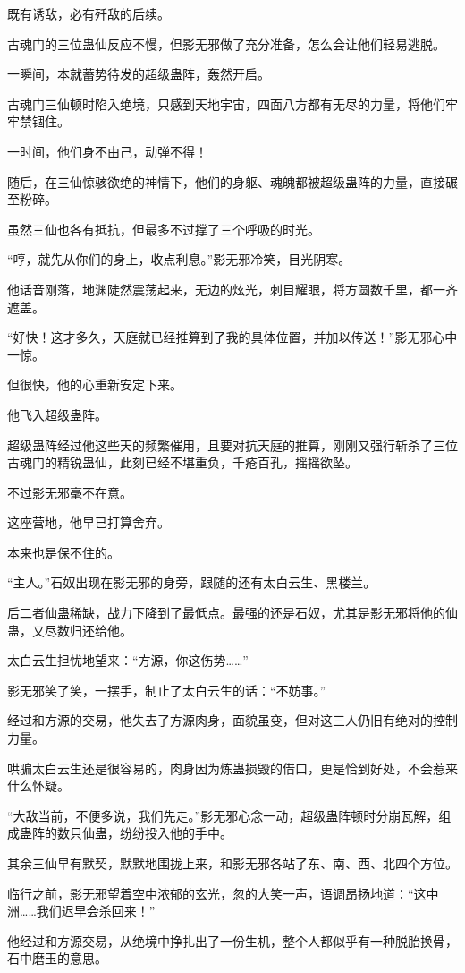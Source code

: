 \begin{this_body}
既有诱敌，必有歼敌的后续。

古魂门的三位蛊仙反应不慢，但影无邪做了充分准备，怎么会让他们轻易逃脱。

一瞬间，本就蓄势待发的超级蛊阵，轰然开启。

古魂门三仙顿时陷入绝境，只感到天地宇宙，四面八方都有无尽的力量，将他们牢牢禁锢住。

一时间，他们身不由己，动弹不得！

随后，在三仙惊骇欲绝的神情下，他们的身躯、魂魄都被超级蛊阵的力量，直接碾至粉碎。

虽然三仙也各有抵抗，但最多不过撑了三个呼吸的时光。

“哼，就先从你们的身上，收点利息。”影无邪冷笑，目光阴寒。

他话音刚落，地渊陡然震荡起来，无边的炫光，刺目耀眼，将方圆数千里，都一齐遮盖。

“好快！这才多久，天庭就已经推算到了我的具体位置，并加以传送！”影无邪心中一惊。

但很快，他的心重新安定下来。

他飞入超级蛊阵。

超级蛊阵经过他这些天的频繁催用，且要对抗天庭的推算，刚刚又强行斩杀了三位古魂门的精锐蛊仙，此刻已经不堪重负，千疮百孔，摇摇欲坠。

不过影无邪毫不在意。

这座营地，他早已打算舍弃。

本来也是保不住的。

“主人。”石奴出现在影无邪的身旁，跟随的还有太白云生、黑楼兰。

后二者仙蛊稀缺，战力下降到了最低点。最强的还是石奴，尤其是影无邪将他的仙蛊，又尽数归还给他。

太白云生担忧地望来：“方源，你这伤势……”

影无邪笑了笑，一摆手，制止了太白云生的话：“不妨事。”

经过和方源的交易，他失去了方源肉身，面貌虽变，但对这三人仍旧有绝对的控制力量。

哄骗太白云生还是很容易的，肉身因为炼蛊损毁的借口，更是恰到好处，不会惹来什么怀疑。

“大敌当前，不便多说，我们先走。”影无邪心念一动，超级蛊阵顿时分崩瓦解，组成蛊阵的数只仙蛊，纷纷投入他的手中。

其余三仙早有默契，默默地围拢上来，和影无邪各站了东、南、西、北四个方位。

临行之前，影无邪望着空中浓郁的玄光，忽的大笑一声，语调昂扬地道：“这中洲……我们迟早会杀回来！”

他经过和方源交易，从绝境中挣扎出了一份生机，整个人都似乎有一种脱胎换骨，石中磨玉的意思。


\end{this_body}
